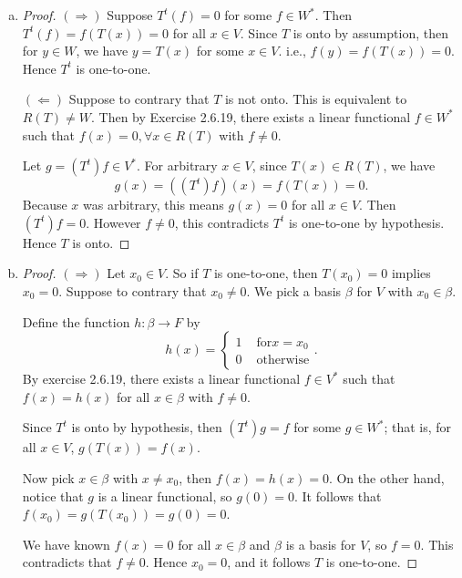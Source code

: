 \begin{Exercise}
	\begin{enumerate}[(a)]
		\item
		\begin{proof}
			$(\Longrightarrow)$
			Suppose $T^t(f) = 0$ for some $f\in W^*$. Then $T^t(f) = f(T(x)) = 0$ for all $x\in V$. Since $T$ is onto by assumption, then for $y\in W$, we have $y=T(x)$ for some $x\in V$. i.e., $f(y) = f(T(x)) = 0$. Hence $T^t$ is one-to-one.
			
			\vspace{2ex}
			
			$(\Longleftarrow)$
			Suppose to contrary that $T$ is not onto. This is equivalent to $R(T)\neq W$. Then by Exercise 2.6.19, there exists a linear functional $f\in W^*$ such that $f(x) = 0, \forall x\in R(T)$ with $f\neq 0$.
			
			Let $g=(T^t)f\in V^*$. For arbitrary $x\in V$, since $T(x)\in R(T)$, we have
			$$
			g(x) = ((T^t)f)(x) = f(T(x)) = 0.
			$$
			Because $x$ was arbitrary, this means $g(x) = 0$ for all $x\in V$. Then $(T^t)f = 0$. However $f\neq 0$, this contradicts $T^t$ is one-to-one by hypothesis. Hence $T$ is onto.
		\end{proof}
		
		\item
		\begin{proof}
			$(\Longrightarrow)$
			Let $x_0\in V$. So if $T$ is one-to-one, then $T(x_0) = 0$ implies $x_0 = 0$. Suppose to contrary that $x_0\neq 0$. We pick a basis $\beta$ for $V$ with $x_0\in\beta$.
			
			Define the function $h:\beta\to F$ by
			$$
			h(x) = \begin{cases}
			1 & \mbox{ for} x=x_0 \\
			0 & \mbox{ otherwise}
			\end{cases}.
			$$
			By exercise 2.6.19, there exists a linear functional $f\in V^*$ such that $f(x) = h(x)$ for all $x\in \beta$ with $f\neq 0$.
			
			Since $T^t$ is onto by hypothesis, then $(T^t)g = f$ for some $g\in W^*$; that is, for all $x\in V$, $g(T(x)) = f(x)$.
			
			Now pick $x\in\beta$ with $x\neq x_0$, then $f(x) = h(x)=0$. On the other hand, notice that $g$ is a linear functional, so $g(0) = 0$. It follows that $f(x_0) = g(T(x_0)) = g(0) = 0$.
			
			We have known $f(x) = 0$ for all $x\in\beta$ and $\beta$ is a basis for $V$, so $f=0$. This contradicts that $f\neq 0$. Hence $x_0 = 0$, and it follows $T$ is one-to-one.
			

\end{proof}
\end{enumerate}
\end{Exercise}
